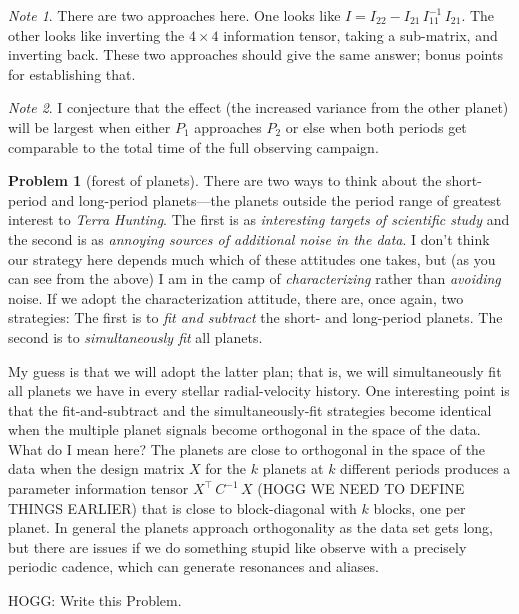 \documentclass{article}
\theoremstyle{definition}
\newcommand{\problemname}{Problem}
\newtheorem{problem}{\problemname}
\theoremstyle{remark}
\newcommand{\notename}{Note}
\newtheorem{note}{\notename}[problem]
\begin{document}
\begin{note}
There are two approaches here.
One looks like $I=I_{22} - I_{21}\,I_{11}^{-1}\,I_{21}$.
The other looks like inverting the $4\times 4$ information tensor, taking a sub-matrix, and inverting back.
These two approaches should give the same answer;
bonus points for establishing that.
\end{note}

\begin{note}
I conjecture that the effect (the increased variance from the other planet) will be largest when either $P_1$ approaches $P_2$ or else when both periods get comparable to the total time of the full observing campaign.
\end{note}

\begin{problem}[forest of planets]\label{prob:planets}
There are two ways to think about the short-period and long-period planets---the planets outside the period range of greatest interest to \textsl{Terra Hunting}.
The first is as \emph{interesting targets of scientific study} and the second is as \emph{annoying sources of additional noise in the data}.
I don't think our strategy here depends much which of these attitudes one takes, but (as you can see from the above) I am in the camp of \emph{characterizing} rather than \emph{avoiding} noise.
If we adopt the characterization attitude, there are, once again, two strategies:
The first is to \emph{fit and subtract} the short- and long-period planets.
The second is to \emph{simultaneously fit} all planets.

My guess is that we will adopt the latter plan; that is, we will simultaneously fit all planets we have in every stellar radial-velocity history.
One interesting point is that the fit-and-subtract and the simultaneously-fit strategies become identical when the multiple planet signals become orthogonal in the space of the data.
What do I mean here?
The planets are close to orthogonal in the space of the data when the design matrix $X$ for the $k$ planets at $k$ different periods produces a parameter information tensor $X^\top\,C^{-1}\,X$ (HOGG WE NEED TO DEFINE THINGS EARLIER) that is close to block-diagonal with $k$ blocks, one per planet.
In general the planets approach orthogonality as the data set gets long, but there are issues if we do something stupid like observe with a precisely periodic cadence, which can generate resonances and aliases.

HOGG: Write this \problemname{}.
\end{problem}
\end{document}
